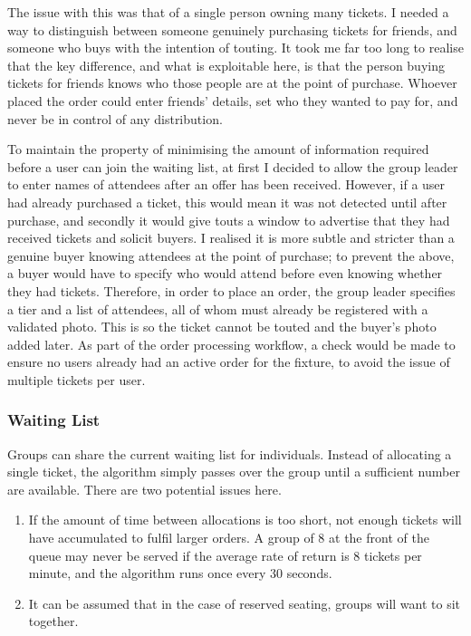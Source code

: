 \documentclass[12pt,a4paper]{bhamdissertation}
\begin{document}
The issue with this was that of a single person owning many tickets. I needed a way to distinguish between someone genuinely purchasing tickets for friends, and someone who buys with the intention of touting. It took me far too long to realise that the key difference, and what is exploitable here, is that the person buying tickets for friends knows who those people are at the point of purchase. Whoever placed the order could enter friends' details, set who they wanted to pay for, and never be in control of any distribution.

To maintain the property of minimising the amount of information required before a user can join the waiting list, at first I decided to allow the group leader to enter names of attendees after an offer has been received. However, if a user had already purchased a ticket, this would mean it was not detected until after purchase, and secondly it would give touts a window to advertise that they had received tickets and solicit buyers. I realised it is more subtle and stricter than a genuine buyer knowing attendees at the point of purchase; to prevent the above, a buyer would have to specify who would attend before even knowing whether they had tickets. Therefore, in order to place an order, the group leader specifies a tier and a list of attendees, all of whom must already be registered with a validated photo. This is so the ticket cannot be touted and the buyer's photo added later. As part of the order processing workflow, a check would be made to ensure no users already had an active order for the fixture, to avoid the issue of multiple tickets per user.

\subsubsection{Waiting List}

Groups can share the current waiting list for individuals. Instead of allocating a single ticket, the algorithm simply passes over the group until a sufficient number are available. There are two potential issues here.

\begin{enumerate}
    \item If the amount of time between allocations is too short, not enough tickets will have accumulated to fulfil larger orders. A group of 8 at the front of the queue may never be served if the average rate of return is 8 tickets per minute, and the algorithm runs once every 30 seconds.
    \item It can be assumed that in the case of reserved seating, groups will want to sit together.
\end{enumerate}
\end{document}
